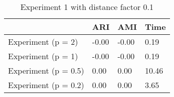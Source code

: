 \begin{table}
\centering
\caption{Experiment 1 with distance factor 0.1}
\begin{tabular}{llll}
\toprule
{} &    ARI &    AMI &   Time \\
\midrule
Experiment (p = 2)   &  -0.00 &  -0.00 &   0.19 \\
Experiment (p = 1)   &  -0.00 &  -0.00 &   0.19 \\
Experiment (p = 0.5) &   0.00 &   0.00 &  10.46 \\
Experiment (p = 0.2) &   0.00 &   0.00 &   3.65 \\
\bottomrule
\end{tabular}
\end{table}
